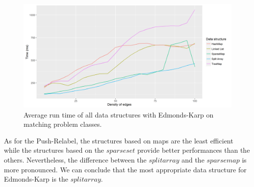 \begin{figure}[H]
\begin{center}
\includegraphics[scale=0.5]{images/results/ekmeanmatching.png}
\caption{Average run time of all data structures with Edmonds-Karp on matching problem classes.}
\label{fig:ekmeanmatching}
\end{center}
\end{figure}
As for the Push-Relabel, the structures based on maps are the least efficient while the structures based on the $sparse set$ provide better performances than the others. Nevertheless, the difference between the $split array$ and the $sparse map$ is more pronounced. 
We can conclude that the most appropriate data structure for Edmonds-Karp is the $split array$.
